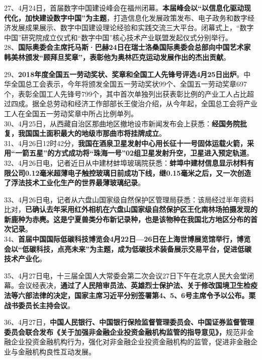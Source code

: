 27、4月24日，首届数字中国建设峰会在福州闭幕。{\textbf{本届峰会以``以信息化驱动现代化，加快建设数字中国''为主题}}，打造信息化发展政策发布、电子政务和数字经济发展成果展示、数字中国建设理论经验和实践交流三大平台。闭幕式上，``数字中国''研究院成立仪式和``数字中国''核心技术产业联盟发起仪式分别举行。\\
28、{\textbf{国际奥委会主席托马斯·巴赫24日在瑞士洛桑国际奥委会总部向中国艺术家韩美林颁发``顾拜旦奖章''，表彰他为奥林匹克运动发展作出的杰出贡献}}。

29、{\textbf{2018年度全国五一劳动奖状、奖章和全国工人先锋号评选4月25日出炉}}。中华全国总工会表示，今年将颁发全国五一劳动奖状99个、全国五一劳动奖章697个，表彰全国工人先锋号799个，其中首次单独列出获表彰比例的产业工人占比超过四成。据全总劳动和经济工作部部长王俊治介绍，从今年起，全国总工会将产业工人在全国五一劳动奖章中所占比例单列。\\
30、4月25日，从西藏自治区那曲地区撤地设市新闻发布会上获悉：{\textbf{经国务院批复，我国国土面积最大的地级市那曲市将挂牌成立}}。\\
31、4月26日12时42分，{\textbf{我国在酒泉卫星发射中心用长征十一号固体运载火箭，采用``一箭五星''的方式成功将``珠海一号''02组卫星发射升空，卫星进入预定轨道}}。\\
32、4月26日电，记者近日从中建材蚌埠玻璃院获悉：{\textbf{蚌埠中建材信息显示材料有限公司0.12毫米超薄电子触控玻璃日前成功下线，继0.15毫米之后，又一次创造了浮法技术工业化生产的世界最薄玻璃纪录}}。

33、4月26日电，记者从六盘山国家级自然保护区管理局获悉：该局经过半年资料比对，\textbf{{已确认去年采用红外相机在六盘山国家级自然保护区王化南林场拍摄发现的新鹿种为赤麂。这是宁夏兽类分布新记录种，也是该物种在我国北方地区分布的首次记录}}。\\
34、{\textbf{首届中国国际低碳科技博览会4月22日---26日在上海世博展览馆举行，博览会以``低碳科技，点亮未来''为主题，成为低碳技术装备展示交易平台，促进低碳技术产业化}}。

35、4月27日电，十三届全国人大常委会第二次会议27日下午在北京人民大会堂闭幕。会议经表决，{\textbf{通过了人民陪审员法、英雄烈士保护法、关于修改国境卫生检疫法等六部法律的决定，国家主席习近平分别签署第4、5、6号主席令予以公布。栗战书委员长主持会议}}。

36、4月27日，{\textbf{中国人民银行、中国银行保险监督管理委员会、中国证券监督管理委员会联合发布《关于加强非金融企业投资金融机构监管的指导意见》，}}规范非金融企业投资金融机构行为，强化对非金融企业投资金融机构的监管，促进非金融企业与金融机构良性互动发展。
